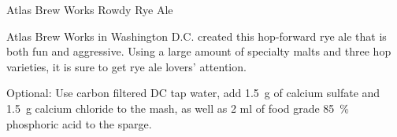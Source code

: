 \stylesection{\styleamericanwheatorrye}

\begin{recipie}{Atlas Brew Works Rowdy Rye Ale}

\begin{aboutblock}
Atlas Brew Works in Washington D.C. created this hop-forward rye ale that is both
fun and aggressive. Using a large amount of specialty malts and three hop varieties,
it is sure to get rye ale lovers' attention.
\end{aboutblock}


\begin{methodandtiming}
 
\begin{mashsteps}
\end{mashsteps}

\begin{directions}
Optional: Use carbon filtered DC tap water, add 1.5~g of calcium sulfate and
1.5~g calcium chloride to the mash, as well as 2 ml of food grade 85~\%
phosphoric acid to the sparge.
\end{directions}

\end{methodandtiming}

\pagebreak

\begin{ingredientsblock}

\begin{malts}
\end{malts}

\begin{hops}
\end{hops}

\begin{yeasts}
\end{yeasts}

\end{ingredientsblock}

\end{recipie}

